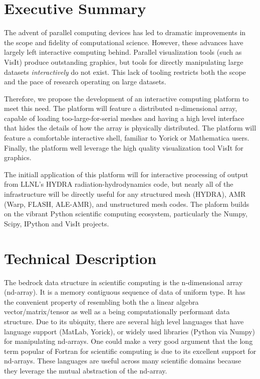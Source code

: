 \documentclass[letterpaper,11pt]{article}
\begin{document}

\setlength{\parindent}{15pt}
\section*{Executive Summary }

The advent of parallel computing devices has led to dramatic improvements in the scope and fidelity of computational science.  However, these advances have largely left interactive computing behind.  Parallel visualization tools (such as VisIt) produce outstanding graphics, but tools for directly manipulating large datasets \emph{interactively} do not exist.  This lack of tooling restricts both the scope and the pace of research operating on large datasets.

Therefore, we propose the development of an interactive computing platform to meet this need.  The platform will feature a distributed n-dimensional array, capable of loading too-large-for-serial meshes and having a high level interface that hides the details of how the array is physically distributed.  The platform will feature a comfortable interactive shell, familiar to Yorick or Mathematica users.  Finally, the platform well leverage the high quality visualization tool VisIt for graphics.

The initiall application of this platform will for interactive processing of output from LLNL's HYDRA\cite{Marinak2001} radiation-hydrodynamics code, but nearly all of the infrastructure will be directly useful for any structured mesh (HYDRA), AMR (Warp\cite{Grote2005}, FLASH\cite{flash}, ALE-AMR\cite{Koniges2010}), and unstructured mesh codes.  The plaform builds on the vibrant Python scientific computing ecosystem, particularly the Numpy\cite{Oliphant2006}, Scipy\cite{numpyscipy}, IPython\cite{ipython} and VisIt\cite{VisIt} projects.


\section*{Technical Description}

The bedrock data structure in scientific computing is the n-dimensional array (nd-array).  It is a memory contiguous sequence of data of uniform type.  It has the convenient property of resembling both the a linear algebra vector/matrix/tensor as well as a being computationally performant data structure.  Due to its ubiquity, there are several high level languages that have language support (MatLab\cite{matlab}, Yorick\cite{Munro1995}), or widely used libraries (Python\cite{CPython} via Numpy\cite{Oliphant2006}) for manipulating nd-arrays.  One could make a very good argument that the long term popular of Fortran for scientific computing is due to its excellent support for nd-arrays.  These languages are useful across many scientific domains because they leverage the mutual abstraction of the nd-array.
\end{document}
